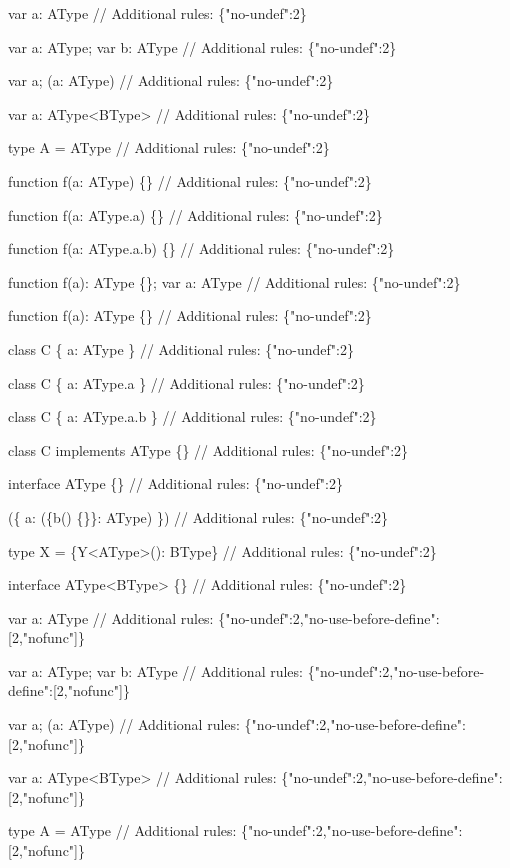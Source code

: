 \begin{DoxyCode}
var a: AType
// Additional rules: \{"no-undef":2\}

var a: AType; var b: AType
// Additional rules: \{"no-undef":2\}

var a; (a: AType)
// Additional rules: \{"no-undef":2\}

var a: AType<BType>
// Additional rules: \{"no-undef":2\}

type A = AType
// Additional rules: \{"no-undef":2\}

function f(a: AType) \{\}
// Additional rules: \{"no-undef":2\}

function f(a: AType.a) \{\}
// Additional rules: \{"no-undef":2\}

function f(a: AType.a.b) \{\}
// Additional rules: \{"no-undef":2\}

function f(a): AType \{\}; var a: AType
// Additional rules: \{"no-undef":2\}

function f(a): AType \{\}
// Additional rules: \{"no-undef":2\}

class C \{ a: AType \}
// Additional rules: \{"no-undef":2\}

class C \{ a: AType.a \}
// Additional rules: \{"no-undef":2\}

class C \{ a: AType.a.b \}
// Additional rules: \{"no-undef":2\}

class C implements AType \{\}
// Additional rules: \{"no-undef":2\}

interface AType \{\}
// Additional rules: \{"no-undef":2\}

(\{ a: (\{b() \{\}\}: AType) \})
// Additional rules: \{"no-undef":2\}

type X = \{Y<AType>(): BType\}
// Additional rules: \{"no-undef":2\}

interface AType<BType> \{\}
// Additional rules: \{"no-undef":2\}

var a: AType
// Additional rules: \{"no-undef":2,"no-use-before-define":[2,"nofunc"]\}

var a: AType; var b: AType
// Additional rules: \{"no-undef":2,"no-use-before-define":[2,"nofunc"]\}

var a; (a: AType)
// Additional rules: \{"no-undef":2,"no-use-before-define":[2,"nofunc"]\}

var a: AType<BType>
// Additional rules: \{"no-undef":2,"no-use-before-define":[2,"nofunc"]\}

type A = AType
// Additional rules: \{"no-undef":2,"no-use-before-define":[2,"nofunc"]\}


\end{DoxyCode}
